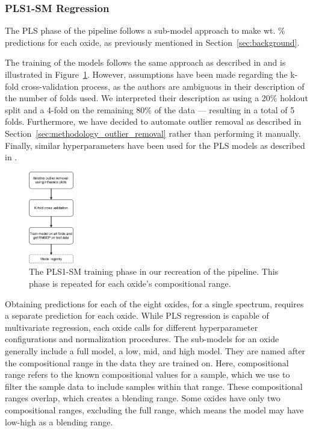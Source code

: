 \subsubsection{PLS1-SM Regression}\label{sec:methodology_pls1-sm_regression}
The PLS phase of the pipeline follows a sub-model approach to make wt. \% predictions for each oxide, as previously mentioned in Section~\ref{sec:background}.

The training of the models follows the same approach as described in \citet{andersonImprovedAccuracyQuantitative2017} and is illustrated in Figure~\ref{fig:pls_training}.
However, assumptions have been made regarding the k-fold cross-validation process, as the authors are ambiguous in their description of the number of folds used.
We interpreted their description as using a 20\% holdout split and a 4-fold on the remaining 80\% of the data --- resulting in a total of 5 folds.
Furthermore, we have decided to automate outlier removal as described in Section~\ref{sec:methodology_outlier_removal} rather than performing it manually.
Finally, similar hyperparameters have been used for the PLS models as described in \citet{andersonImprovedAccuracyQuantitative2017}.

\begin{figure}
	\centering
	\includegraphics[width=0.175\textwidth]{images/pls_training.png}
	\caption{The PLS1-SM training phase in our recreation of the pipeline. This phase is repeated for each oxide's compositional range.}
	\label{fig:pls_training}
\end{figure}

Obtaining predictions for each of the eight oxides, for a single spectrum, requires a separate prediction for each oxide. While PLS regression is capable of multivariate regression, each oxide calls for different hyperparameter configurations and normalization procedures.
The sub-models for an oxide generally include a full model, a low, mid, and high model. They are named after the compositional range in the data they are trained on. Here, compositional range refers to the known compositional values for a sample, which we use to filter the sample data to include samples within that range.
These compositional ranges overlap, which creates a blending range.
Some oxides have only two compositional ranges, excluding the full range, which means the model may have low-high as a blending range.

